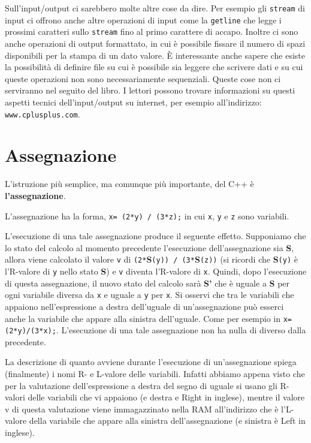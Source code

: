 \documentclass[a4paper,12pt]{book}
\begin{document}
Sull'input/output ci sarebbero molte altre cose da dire. Per esempio gli \texttt{stream} di input ci offrono anche altre operazioni di input come la \texttt{getline} che legge i prossimi caratteri sullo \texttt{stream} fino al primo carattere di accapo. Inoltre ci so­no anche operazioni di output formattato, in cui è possibile fissare il numero di spazi disponibili per la stampa di un dato valore. È interessante anche sapere che esiste la possibilità di definire file su cui è possibile sia leggere che scrive­re dati e su cui queste operazioni non sono necessariamente sequenziali. Queste cose non ci serviranno nel seguito del libro. I lettori possono trovare informazioni su questi aspetti tecnici dell'input/output su internet, per esempio all'indirizzo: \texttt{www.cplusplus.com}. 

\section{Assegnazione}
L'istruzione più semplice, ma comunque più importante, del C++ è \textbf{l'assegnazione}.

\noindent L'assegnazione ha la forma, \texttt{x= (2*y) / (3*z);} in cui \texttt{x}, \texttt{y} e \texttt{z} sono variabili.

\noindent L'esecuzione di una tale assegnazione produce il seguente effetto. Supponiamo che lo stato del calcolo al momento precedente l'esecuzione dell'assegnazione sia \textbf{S}, allora viene calcolato il valore \texttt{v} di \texttt{(2*}\textbf{S}\texttt{(y)) / (3*}\textbf{S}\texttt{(z))} (si ricordi che \textbf{S}\texttt{(y)} è l'R-valore di \texttt{y} nello stato \textbf{S}) e \texttt{v} diventa l'R-valore di \texttt{x}. Quindi, dopo l'esecuzione di questa assegnazione, il nuovo stato del calcolo sarà \textbf{S'} che è uguale a \textbf{S} per ogni variabile diversa da \texttt{x} e uguale a \texttt{y} per \texttt{x}. Si osservi che tra le variabili che appaiono nell'espressione a destra dell'uguale di un'assegnazione può esserci anche la variabile che appare alla sinistra dell'uguale. Come per esempio in \texttt{x=(2*y)/(3*x);}. L'esecuzione di una tale assegnazione non ha nulla di diverso dalla precedente. 

La descrizione di quanto avviene durante l'esecuzione di un'assegnazione spiega (finalmente) i nomi R- e L-valore delle variabili. Infatti abbiamo appena visto che per la valutazione dell'espressione a destra del segno di uguale si usano gli R-valori delle variabili che vi appaiono (e destra e Right in inglese), mentre il valore v di questa valutazione viene immagazzinato nella RAM all'indirizzo che è l'L-valore della variabile che appare alla sinistra dell'assegnazione (e sinistra è Left in inglese). 
\end{document}
